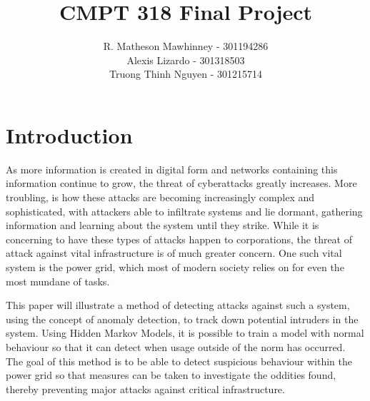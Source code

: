 \documentclass[letterpaper, 11pt]{article}%
\begin{document}
\title{\textbf{CMPT 318 Final Project}}
\author{R. Matheson Mawhinney - 301194286 \\ Alexis Lizardo - 301318503 \\ Truong Thinh Nguyen - 301215714}

\maketitle


\newpage   
\tableofcontents
\newpage
\listoffigures
\newpage

\section{Introduction}
  As more information is created in digital form and networks containing this information continue to grow, the threat of cyberattacks greatly increases. More troubling, is how these attacks are becoming increasingly complex and sophisticated, with attackers able to infiltrate systems and lie dormant, gathering information and learning about the system until they strike. While it is concerning to have these types of attacks happen to corporations, the threat of attack against vital infrastructure is of much greater concern. One such vital system is the power grid, which most of modern society relies on for even the most mundane of tasks. 
	
This paper will illustrate a method of detecting attacks against such a system, using the concept of anomaly detection, to track down potential intruders in the system. Using Hidden Markov Models, it is possible to train a model with normal behaviour so that it can detect when usage outside of the norm has occurred. The goal of this method is to be able to detect suspicious behaviour within the power grid so that measures can be taken to investigate the oddities found, thereby preventing major attacks against critical infrastructure.
\end{document}
